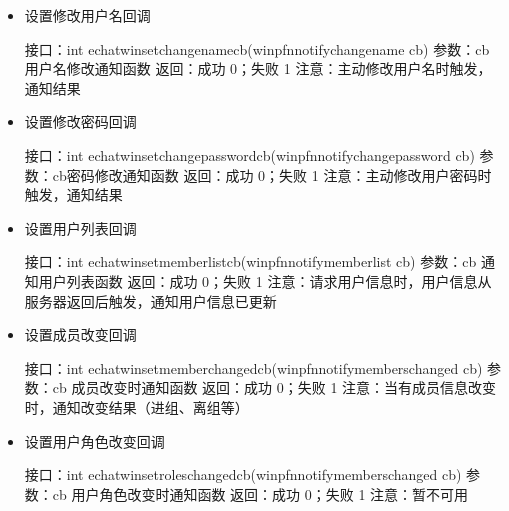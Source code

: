 \documentclass[letterpaper,10pt,english]{sphinxmanual}
\begin{document}
\begin{itemize}
\item {} 
设置修改用户名回调

%
\begin{sphinxVerbatim}[commandchars=\\\{\}]
接口：int echat\PYGZus{}win\PYGZus{}set\PYGZus{}change\PYGZus{}name\PYGZus{}cb(win\PYGZus{}pfn\PYGZus{}notify\PYGZus{}change\PYGZus{}name cb)
参数：cb  用户名修改通知函数
返回：成功 0；失败 \PYGZhy{}1
注意：主动修改用户名时触发，通知结果
\end{sphinxVerbatim}

\item {} 
设置修改密码回调

%
\begin{sphinxVerbatim}[commandchars=\\\{\}]
接口：int echat\PYGZus{}win\PYGZus{}set\PYGZus{}change\PYGZus{}password\PYGZus{}cb(win\PYGZus{}pfn\PYGZus{}notify\PYGZus{}change\PYGZus{}password cb)
参数：cb密码修改通知函数
返回：成功 0；失败 \PYGZhy{}1
注意：主动修改用户密码时触发，通知结果
\end{sphinxVerbatim}

\item {} 
设置用户列表回调

%
\begin{sphinxVerbatim}[commandchars=\\\{\}]
接口：int echat\PYGZus{}win\PYGZus{}set\PYGZus{}memberlist\PYGZus{}cb(win\PYGZus{}pfn\PYGZus{}notify\PYGZus{}memberlist cb)
参数：cb 通知用户列表函数
返回：成功 0；失败 \PYGZhy{}1
注意：请求用户信息时，用户信息从服务器返回后触发，通知用户信息已更新
\end{sphinxVerbatim}

\item {} 
设置成员改变回调

%
\begin{sphinxVerbatim}[commandchars=\\\{\}]
接口：int echat\PYGZus{}win\PYGZus{}set\PYGZus{}member\PYGZus{}changed\PYGZus{}cb(win\PYGZus{}pfn\PYGZus{}notify\PYGZus{}members\PYGZus{}changed cb)
参数：cb 成员改变时通知函数
返回：成功 0；失败 \PYGZhy{}1
注意：当有成员信息改变时，通知改变结果（进组、离组等）
\end{sphinxVerbatim}

\item {} 
设置用户角色改变回调

%
\begin{sphinxVerbatim}[commandchars=\\\{\}]
接口：int echat\PYGZus{}win\PYGZus{}set\PYGZus{}roles\PYGZus{}changed\PYGZus{}cb(win\PYGZus{}pfn\PYGZus{}notify\PYGZus{}members\PYGZus{}changed cb)
参数：cb  用户角色改变时通知函数
返回：成功 0；失败 \PYGZhy{}1
注意：暂不可用
\end{sphinxVerbatim}


\end{itemize}
\end{document}
